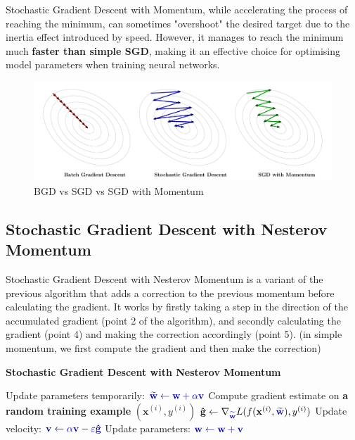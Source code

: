Stochastic Gradient Descent with Momentum, while accelerating the process of reaching the minimum, can sometimes "overshoot" the desired target due to the inertia effect introduced by speed. However, it manages to reach the minimum much \textbf{faster than simple SGD}, making it an effective choice for optimising model parameters when training neural networks.


\begin{figure}[htbp]
\centering
\includegraphics[width=\textwidth]{tikz/chapter3 - BGD vs SGD vs SGD with Momentum.pdf}
\caption{BGD vs SGD vs SGD with Momentum}
\end{figure}

\subsection{Stochastic Gradient Descent with Nesterov Momentum}

Stochastic Gradient Descent with Nesterov Momentum is a variant of the previous algorithm that adds a correction to the previous momentum before calculating the gradient. It works by firstly taking a step in the direction of the accumulated gradient (point 2 of the algorithm), and secondly calculating the gradient (point 4) and making the correction accordingly (point 5). (in simple momentum, we first compute the gradient and then make the correction) 

\begin{algorithm}
\renewcommand\thealgorithm{}
\caption{\textbf{\textcolor{mygreen}{Stochastic Gradient Descent with Nesterov Momentum}}}
\begin{algorithmic}[1]
\STATE Update parameters temporarily:
$\textcolor{mybluee}{\widetilde{\mathbf{w}} \leftarrow \mathbf{w} + \alpha \mathbf{v}}$
\STATE Compute gradient estimate on \textbf{\textcolor{myred}{a random training example}} $(\mathbf{x}^{(i)}, y^{(i)})$
\STATE $\mathbf{\hat{g}} \leftarrow \nabla_{\textcolor{mybluee}{\widetilde{\mathbf{w}}}} L(f(\mathbf{x}^{(i)},\textcolor{mybluee}{\widetilde{\mathbf{w}}}), y^{(i)})$
\STATE Update velocity:
$\textcolor{mybluee}{\mathbf{v} \leftarrow \alpha \mathbf{v} - \varepsilon \mathbf{\hat{g}}}$
\STATE Update parameters:
$\textcolor{mybluee}{\mathbf{w} \leftarrow \mathbf{w} + \mathbf{v}}$
\ENDWHILE
\end{algorithmic}
\end{algorithm}

